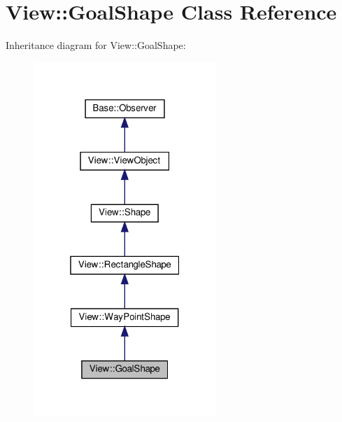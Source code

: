 \hypertarget{class_view_1_1_goal_shape}{}\section{View\+:\+:Goal\+Shape Class Reference}
\label{class_view_1_1_goal_shape}


Inheritance diagram for View\+:\+:Goal\+Shape\+:
\nopagebreak
\begin{figure}[H]
\begin{center}
\leavevmode
\includegraphics[width=196pt]{class_view_1_1_goal_shape__inherit__graph}
\end{center}
\end{figure}



